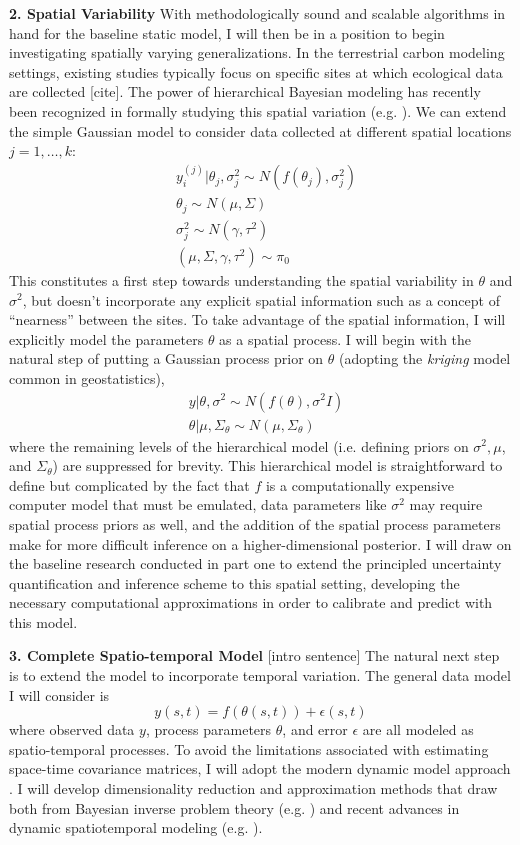 \documentclass[12pt]{article}
\begin{document}
 \textbf{2. Spatial Variability} With methodologically sound and scalable algorithms in hand for the baseline static model, I will then be in a position to begin investigating spatially varying generalizations. 
 In the terrestrial carbon modeling settings, existing studies typically focus on specific sites at which ecological data are collected [cite].  The power of hierarchical Bayesian modeling has recently been recognized in 
 formally studying this spatial variation (e.g. \cite{Fer2}). We can extend the simple Gaussian model to consider data collected at different spatial locations $j = 1, \dots, k$:
 \begin{align*}
 &y^{(j)}_i|\theta_j, \sigma_j^2 \sim N(f(\theta_j), \sigma_j^2) \\
 &\theta_j \sim N(\mu, \Sigma) \\
 &\sigma_j^2 \sim N(\gamma, \tau^2) \\
 &(\mu, \Sigma, \gamma, \tau^2) \sim \pi_0
 \end{align*}
 This constitutes a first step towards understanding the spatial variability in $\theta$ and $\sigma^2$, but doesn't incorporate any explicit spatial information such as a concept of ``nearness'' between the sites. 
 To take advantage of the spatial information, I will explicitly model the parameters $\theta$ as a spatial process. I will begin with the natural step of putting a Gaussian process prior on $\theta$ (adopting
 the \textit{kriging} model common in geostatistics),
 \begin{align*}
 &y|\theta, \sigma^2 \sim N(f(\theta), \sigma^2 I) \\
 &\theta|\mu, \Sigma_\theta \sim N(\mu, \Sigma_\theta)
 \end{align*}
 where the remaining levels of the hierarchical model (i.e. defining priors on $\sigma^2, \mu$, and $\Sigma_\theta$) are suppressed for brevity. This hierarchical model is straightforward to define
 but complicated by the fact that $f$ is a computationally expensive computer model that must be emulated, data parameters like $\sigma^2$ may require spatial process priors as well,
 and the addition of the spatial process parameters make for more difficult inference on a higher-dimensional posterior. I will draw on the baseline research conducted in part one to extend the principled uncertainty quantification and inference scheme to this spatial setting, developing the necessary computational approximations in order to calibrate and predict with this model. 
 
  \textbf{3. Complete Spatio-temporal Model}
  [intro sentence] The natural next step is to extend the model to incorporate temporal variation. The general data model I will consider is 
  \[y(s, t) = f(\theta(s, t)) + \epsilon(s, t)\]
  where observed data $y$, process parameters $\theta$, and error $\epsilon$ are all modeled as spatio-temporal processes. 
  To avoid the limitations associated with estimating space-time covariance matrices, I will adopt the modern dynamic model approach \cite{Arab}. I will develop dimensionality 
  reduction and approximation methods that draw both from Bayesian inverse problem theory (e.g. \cite{Kugler}) and recent advances in 
  dynamic spatiotemporal modeling (e.g. \cite{Hefley}). 
 
\end{document}
